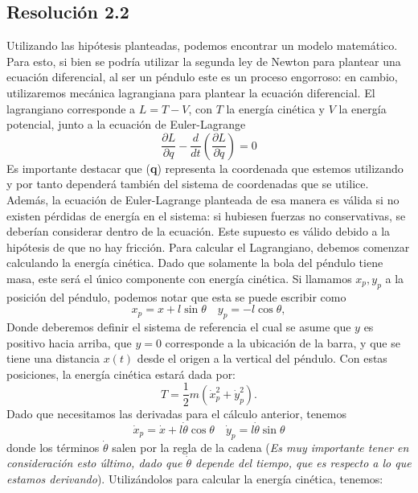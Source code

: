 \documentclass[
  11pt,
  letterpaper,
   addpoints,
   answers
  ]{exam}
\begin{document}
\begin{questions}
\begin{solution}
\subsection*{Resolución 2.2}
Utilizando las hipótesis planteadas, podemos encontrar un modelo matemático. Para esto, si bien se podría utilizar la segunda ley de Newton para plantear una ecuación diferencial, al ser un péndulo este es un proceso engorroso: en cambio, utilizaremos mecánica lagrangiana para plantear la ecuación diferencial. El lagrangiano corresponde a $L = T - V$, con $T$ la energía cinética y $V$ la energía potencial, junto a la ecuación de Euler-Lagrange
\begin{equation}
    \frac{\partial L}{\partial q} - \frac{d}{dt} \left( \frac{\partial L}{\partial \dot{q}} \right) = 0
\end{equation}
Es importante destacar que (\textbf{q}) representa la coordenada que estemos utilizando y por tanto dependerá también del sistema de coordenadas que se utilice. Además, la ecuación de Euler-Lagrange planteada de esa manera es válida si no existen pérdidas de energía en el sistema: si hubiesen fuerzas no conservativas, se deberían considerar dentro de la ecuación. Este supuesto es válido debido a la hipótesis de que no hay fricción. Para calcular el Lagrangiano, debemos comenzar calculando la energía cinética. Dado que solamente la bola del péndulo tiene masa, este será el único componente con energía cinética. Si llamamos $x_p, y_p$ a la posición del péndulo, podemos notar que esta se puede escribir como
\begin{equation}
    x_p = x + l \sin \theta \quad y_p = -l \cos \theta,
\end{equation}
Donde deberemos definir el sistema de referencia el cual se asume que $y$ es positivo hacia arriba, que $y = 0$ corresponde a la ubicación de la barra, y que se tiene una distancia $x(t)$ desde el origen a la vertical del péndulo. Con estas posiciones, la energía cinética estará dada por:
\begin{equation}
    T = \frac{1}{2} m \left( \dot{x}_p^2 + \dot{y}_p^2 \right). 
\end{equation}
 Dado que necesitamos las derivadas para el cálculo anterior, tenemos
\begin{equation}
    \dot{x}_p = \dot{x} + l \dot{\theta} \cos \theta \quad \dot{y}_p = l \dot{\theta} \sin \theta
\end{equation}
donde los términos $\dot{\theta}$ salen por la regla de la cadena (\textit{Es muy importante tener en consideración esto último, dado que $\dot{\theta}$ depende del tiempo, que es respecto a lo que estamos derivando}). Utilizándolos para calcular la energía cinética, tenemos:

\end{solution}
\end{questions}
\end{document}
